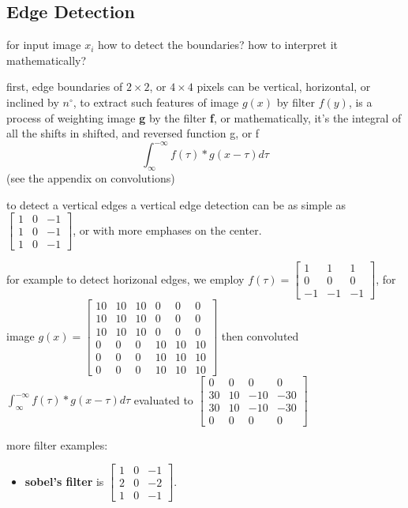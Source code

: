 \documentclass[4apaper,12pt]{book}
\begin{document}
\begin{description}
   \subsection{Edge Detection}
   \begin{description}
    \item for input image $x_i$ how to detect the boundaries? how to interpret it mathematically?
    \item first, edge boundaries of $2\times2$, or $4\times4$ pixels can be vertical, horizontal, or inclined by $n^{\circ}$, to extract such features of image $g(x)$ by filter $f(y)$, is a process of weighting image \textbf{g} by the filter \textbf{f}, or mathematically, it's the integral of all the shifts in shifted, and reversed function g, or f $$ \int_{\infty}^{-\infty}{f(\tau)*g(x-\tau)d\tau} $$ (see the appendix on convolutions)
    \item to detect a vertical edges a vertical edge detection can be as simple as $\begin{bmatrix}1&0&-1\\1&0&-1\\1&0&-1\end{bmatrix}$, or with more emphases on the center.
    \item for example to detect horizonal edges, we employ
      $f(\tau)=\begin{bmatrix}
      1&1&1\\
      0&0&0\\
      -1&-1&-1\end{bmatrix}$, for image $g(x)=\begin{bmatrix}
      10&10&10&0&0&0\\
      10&10&10&0&0&0\\
      10&10&10&0&0&0\\
      0&0&0&10&10&10\\
      0&0&0&10&10&10\\
      0&0&0&10&10&10\end{bmatrix}$ then convoluted
      $\int_{\infty}^{-\infty}{f(\tau)*g(x-\tau)d\tau}$ evaluated to $\begin{bmatrix}
        0&0&0&0\\
        30&10&-10&-30\\
        30&10&-10&-30\\
        0&0&0&0 \end{bmatrix}$
      \item more filter examples: \begin{itemize}
      \item \textbf{sobel's filter} is $\begin{bmatrix} 1&0&-1\\ 2&0&-2\\ 1&0&-1\end{bmatrix}$.

\end{itemize}
\end{description}
\end{description}
\end{document}
